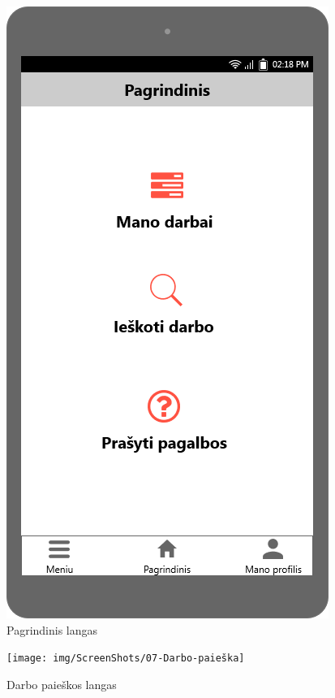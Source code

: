 \documentclass{VUMIFPSbakalaurinis}
\begin{document}
\begin{figure}[H]
	\centering
	\includegraphics[scale=0.4]{img/ScreenShots/12-Pagrindinis-langas}
	\caption{Pagrindinis langas}
	\label{img:main}
\end{figure}

\begin{figure}[H]
	\centering
	\texttt{[image: img/ScreenShots/07-Darbo-paieška]}
	\caption{Darbo paieškos langas}
	\label{img:find work}
\end{figure}
\end{document}
